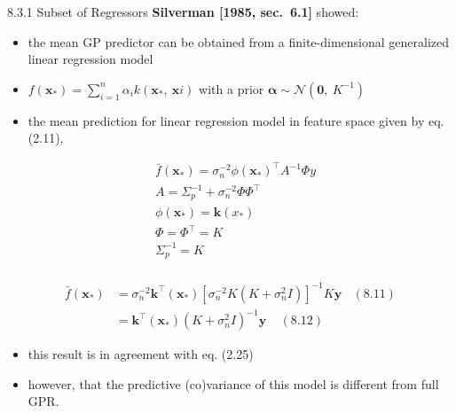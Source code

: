 \documentclass[
  ignorenonframetext,
]{beamer}
\begin{document}
\begin{frame}{8.3.1 Subset of Regressors}
\protect\hypertarget{subset-of-regressors}{}
\textbf{Silverman {[}1985, sec.~6.1{]}} showed:

\begin{itemize}
\item
  the mean GP predictor can be obtained from a finite-dimensional
  generalized linear regression model
\item
  \(f(\pmb x_*) = \sum^n_{i=1} \alpha_i k(\pmb x_*,\ \pmb xi)\) with a
  prior \(\pmb \alpha \sim \mathcal N (\pmb 0,\ K^{-1})\)
\item
  the mean prediction for linear regression model in feature space given
  by eq. (2.11),
\end{itemize}

\[
\begin{split}
& \bar f(\pmb x_*) =  \sigma_n^{-2} \phi(\pmb x_*)^{\top} A^{-1}\Phi y\\
& A =  \Sigma_p^{- 1} +  \sigma_n^{-2}\Phi \Phi^{\top} \\
& \phi(\pmb x_*) = \pmb k(x_*)\\
& \Phi = \Phi^{\top} = K\\
& \Sigma_p^{-1} = K\\ 
\end{split}
\]
\end{frame}

\begin{frame}{}
\protect\hypertarget{section-8}{}
\[
\begin{split}
\bar f(\pmb x_*) & =  \sigma_n^{-2} \pmb k^{\top}(\pmb x_*)[ \sigma_n^{-2}K(K +  \sigma_n^2I)]^{-1}K \pmb y \ \ \ \ (8.11)\\
& = \pmb k^{\top}(\pmb x_*)(K +  \sigma_n^2I)^{-1} \pmb y \ \ \ \ \ (8.12)
\end{split}
\]

\begin{itemize}
\item
  this result is in agreement with eq. (2.25)
\item
  however, that the predictive (co)variance of this model is different
  from full GPR.
\end{itemize}
\end{frame}
\end{document}
